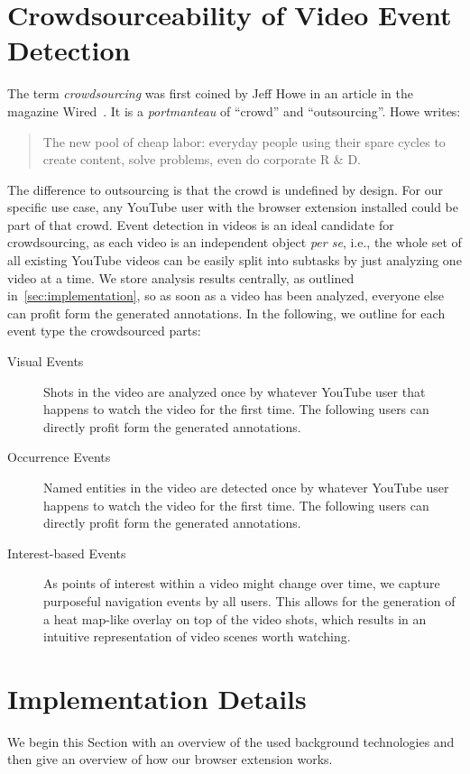 \documentclass[runningheads,a4paper]{llncs}
\begin{document}
\section{Crowdsourceability of Video Event Detection} \label{sec:crowdsourcing}
The term \emph{crowdsourcing} was first coined by Jeff Howe in an article in the magazine Wired~\cite{crowdsourcing}. It is a \textit{portmanteau} of ``crowd'' and ``outsourcing''. Howe writes:

\begin{quotation}
  The new pool of cheap labor: everyday people using their spare cycles to create content, solve problems, even do corporate R \& D.
\end{quotation}

The difference to outsourcing is that the crowd is undefined by design. For our specific use case, any YouTube user with the browser extension installed could be part of that crowd. Event detection in videos is an ideal candidate for crowdsourcing, as each video is an independent object \textit{per se}, i.e., the whole set of all existing YouTube videos can be easily split into subtasks by just analyzing one video at a time. We store analysis results centrally, as outlined in~\autoref{sec:implementation}, so as soon as a video has been analyzed, everyone else can profit form the generated annotations. In the following, we outline for each event type the crowdsourced parts:

\begin{description}
  \item[Visual Events] Shots in the video are analyzed once by whatever YouTube user that happens to watch the video for the first time. The following users can directly profit form the generated annotations.
  \item[Occurrence Events] Named entities in the video are detected once by whatever YouTube user happens to watch the video for the first time. The following users can directly profit form the generated annotations.
  \item[Interest-based Events] As points of interest within a video might change over time, we capture purposeful navigation events by all users. This allows for the generation of a heat map-like overlay on top of the video shots, which results in an intuitive representation of video scenes worth watching.
\end{description} 

\section{Implementation Details} \label{sec:implementation}
We begin this Section with an overview of the used background technologies and then give an overview of how our browser extension works.
\end{document}
